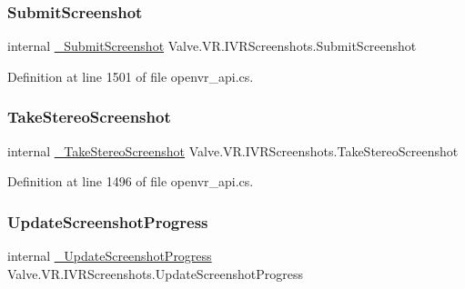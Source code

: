 \mbox{\label{struct_valve_1_1_v_r_1_1_i_v_r_screenshots_ad7a70ed809af5f640c6b3124fd81ed6b}} 
\subsubsection{\texorpdfstring{SubmitScreenshot}{SubmitScreenshot}}
{\footnotesize\ttfamily internal \mbox{\hyperlink{struct_valve_1_1_v_r_1_1_i_v_r_screenshots_aa0b6789713552885537583e9ca318010}{\+\_\+\+Submit\+Screenshot}} Valve.\+V\+R.\+I\+V\+R\+Screenshots.\+Submit\+Screenshot}



Definition at line 1501 of file openvr\+\_\+api.\+cs.

\mbox{\label{struct_valve_1_1_v_r_1_1_i_v_r_screenshots_ac71945882f46a7d76cb5a59e3793df08}} 
\subsubsection{\texorpdfstring{TakeStereoScreenshot}{TakeStereoScreenshot}}
{\footnotesize\ttfamily internal \mbox{\hyperlink{struct_valve_1_1_v_r_1_1_i_v_r_screenshots_ac9eb5e2fe44b9b5a3af94f18dee0dca0}{\+\_\+\+Take\+Stereo\+Screenshot}} Valve.\+V\+R.\+I\+V\+R\+Screenshots.\+Take\+Stereo\+Screenshot}



Definition at line 1496 of file openvr\+\_\+api.\+cs.

\mbox{\label{struct_valve_1_1_v_r_1_1_i_v_r_screenshots_a1103b838e4318b925742b5d3d38e7c9a}} 
\subsubsection{\texorpdfstring{UpdateScreenshotProgress}{UpdateScreenshotProgress}}
{\footnotesize\ttfamily internal \mbox{\hyperlink{struct_valve_1_1_v_r_1_1_i_v_r_screenshots_ad750f504a656fd6a77bda11e07a52cd3}{\+\_\+\+Update\+Screenshot\+Progress}} Valve.\+V\+R.\+I\+V\+R\+Screenshots.\+Update\+Screenshot\+Progress}



